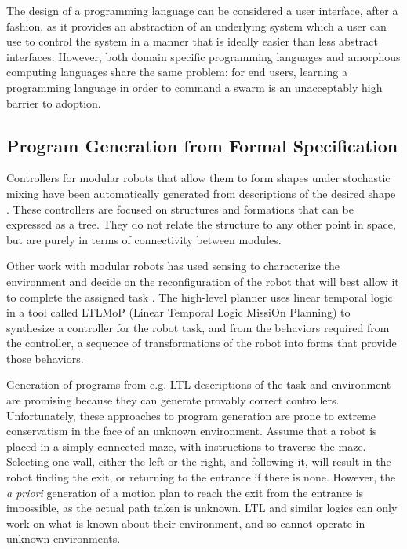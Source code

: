 The design of a programming language can be considered a user interface, after a fashion, as it provides an abstraction of an underlying system which a user can use to control the system in a manner that is ideally easier than less abstract interfaces. 
However, both domain specific programming languages and amorphous computing languages share the same problem: for end users, learning a programming language in order to command a swarm is an unacceptably high barrier to adoption. 

\subsection{Program Generation from Formal Specification} \label{section:Program_Generation}

Controllers for modular robots that allow them to form shapes under stochastic mixing have been automatically generated from descriptions of the desired shape \citep{klavins2002automatic}. 
These controllers are focused on structures and formations that can be expressed as a tree. 
They do not relate the structure to any other point in space, but are purely in terms of connectivity between modules. 

Other work with modular robots has used sensing to characterize the environment and decide on the reconfiguration of the robot that will best allow it to complete the assigned task \citep{daudelin2017integrated, jing2016end}.
The high-level planner uses linear temporal logic in a tool called LTLMoP (Linear Temporal Logic MissiOn Planning) to synthesize a controller for the robot task, and from the behaviors required from the controller, a sequence of transformations of the robot into forms that provide those behaviors. 
	
Generation of programs from e.g. LTL descriptions of the task and environment are promising because they can generate provably correct controllers.
Unfortunately, these approaches to program generation are prone to extreme conservatism in the face of an unknown environment. 
Assume that a robot is placed in a simply-connected maze, with instructions to traverse the maze. 
Selecting one wall, either the left or the right, and following it, will result in the robot finding the exit, or returning to the entrance if there is none. 
However, the \emph{a priori} generation of a motion plan to reach the exit from the entrance is impossible, as the actual path taken is unknown. 
LTL and similar logics can only work on what is known about their environment, and so cannot operate in unknown environments. 
	
